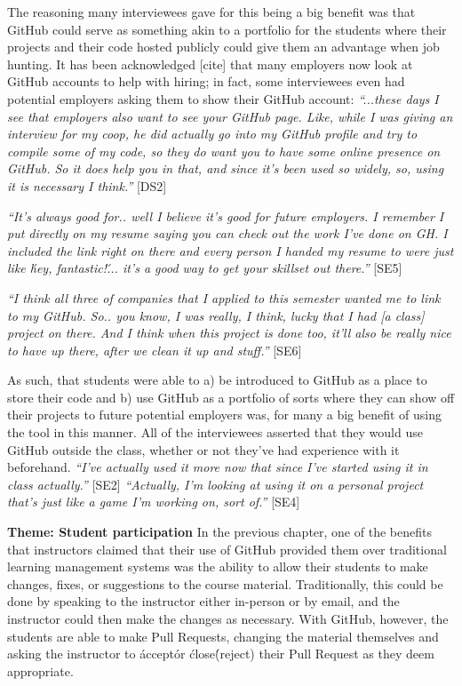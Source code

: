 The reasoning many interviewees gave for this being a big benefit was that GitHub could serve as something akin to a portfolio for the students where their projects and their code hosted publicly could give them an advantage when job hunting. It has been acknowledged [cite] that many employers now look at GitHub accounts to help with hiring; in fact, some interviewees even had potential employers asking them to show their GitHub account: \textit{``...these days I see that employers also want to see your GitHub page. Like, while I was giving an interview for my coop, he did actually go into my GitHub profile and try to compile some of my code, so they do want you to have some online presence on GitHub. So it does help you in that, and since it's been used so widely, so, using it is necessary I think.''} [DS2]

\textit{``It's always good for.. well I believe it's good for future employers. I remember I put directly on my resume saying you can check out the work I've done on GH. I included the link right on there and every person I handed my resume to were just like \'hey, fantastic!\'... it's a good way to get your skillset out there.''} [SE5]

\textit{``I think all three of companies that I applied to this semester wanted me to link to my GitHub. So.. you know, I was really, I think, lucky that I had [a class] project on there. And I think when this project is done too, it'll also be really nice to have up there, after we clean it up and stuff.''} [SE6]

As such, that students were able to a) be introduced to GitHub as a place to store their code and b) use GitHub as a portfolio of sorts where they can show off their projects to future potential employers was, for many a big benefit of using the tool in this manner. All of the interviewees asserted that they would use GitHub outside the class, whether or not they've had experience with it beforehand. \textit{``I've actually used it more now that since I've started using it in class actually.''} [SE2] \textit{``Actually, I'm looking at using it on a personal project that's just like a game I'm working on, sort of.''} [SE4]

\textbf{Theme: Student participation} \break %
In the previous chapter, one of the benefits that instructors claimed that their use of GitHub provided them over traditional learning management systems was the ability to allow their students to make changes, fixes, or suggestions to the course material. Traditionally, this could be done by speaking to the instructor either in-person or by email, and the instructor could then make the changes as necessary. With GitHub, however, the students are able to make Pull Requests, changing the material themselves and asking the instructor to \'accept\' or \'close\' (reject) their Pull Request as they deem appropriate.

